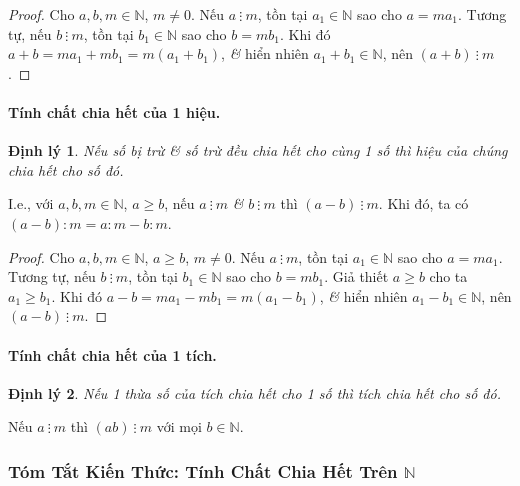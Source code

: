 \documentclass{article}
\numberwithin{equation}{section}
\newtheorem{dinhly}{Định lý}[section]
\begin{document}
\begin{proof}[Proof]
	Cho $a,b,m\in\mathbb{N}$, $m\ne 0$. Nếu $a\ \vdots\ m$, tồn tại $a_1\in\mathbb{N}$ sao cho $a = ma_1$. Tương tự, nếu $b\ \vdots\ m$, tồn tại $b_1\in\mathbb{N}$ sao cho $b = mb_1$. Khi đó $a + b = ma_1 + mb_1 = m(a_1 + b_1)$, \textit{\&} hiển nhiên $a_1 + b_1\in\mathbb{N}$, nên $(a + b)\ \vdots\ m$.
\end{proof}

\paragraph{Tính chất chia hết của 1 hiệu.}
\begin{dinhly}
	Nếu số bị trừ \textit{\&} số trừ đều chia hết cho cùng 1 số thì hiệu của chúng chia hết cho số đó.
\end{dinhly}
I.e., với $a,b,m\in\mathbb{N}$, $a\ge b$, nếu $a\ \vdots\ m$ \textit{\&} $b\ \vdots\ m$ thì $(a - b)\ \vdots\ m$. Khi đó, ta có $(a - b):m = a:m - b:m$.

\begin{proof}[Proof]
	Cho $a,b,m\in\mathbb{N}$, $a\ge b$, $m\ne 0$. Nếu $a\ \vdots\ m$, tồn tại $a_1\in\mathbb{N}$ sao cho $a = ma_1$. Tương tự, nếu $b\ \vdots\ m$, tồn tại $b_1\in\mathbb{N}$ sao cho $b = mb_1$. Giả thiết $a\ge b$ cho ta $a_1\ge b_1$. Khi đó $a - b = ma_1 - mb_1 = m(a_1 - b_1)$, \textit{\&} hiển nhiên $a_1 - b_1\in\mathbb{N}$, nên $(a - b)\ \vdots\ m$.
\end{proof}

\paragraph{Tính chất chia hết của 1 tích.}
\begin{dinhly}
	Nếu 1 thừa số của tích chia hết cho 1 số thì tích chia hết cho số đó.
\end{dinhly}
Nếu $a\ \vdots\ m$  thì $(ab)\ \vdots\ m$ với mọi $b\in\mathbb{N}$.

\subsubsection{Tóm Tắt Kiến Thức: Tính Chất Chia Hết Trên $\mathbb{N}$}
\end{document}
